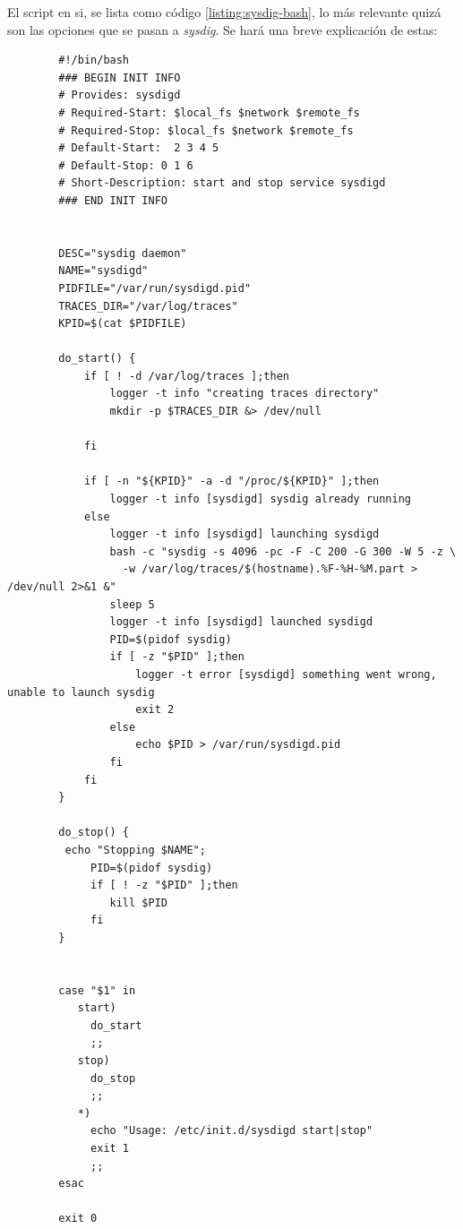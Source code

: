 El script en si, se lista como código \ref{listing:sysdig-bash}, lo más relevante quizá
son las opciones que se pasan a \emph{sysdig}. Se hará una breve explicación de estas:
 \begin{verbatim}
        #!/bin/bash
        ### BEGIN INIT INFO
        # Provides: sysdigd
        # Required-Start: $local_fs $network $remote_fs
        # Required-Stop: $local_fs $network $remote_fs
        # Default-Start:  2 3 4 5
        # Default-Stop: 0 1 6
        # Short-Description: start and stop service sysdigd
        ### END INIT INFO
        
        
        DESC="sysdig daemon"
        NAME="sysdigd"
        PIDFILE="/var/run/sysdigd.pid"
        TRACES_DIR="/var/log/traces"
        KPID=$(cat $PIDFILE)
        
        do_start() {
            if [ ! -d /var/log/traces ];then
                logger -t info "creating traces directory"
                mkdir -p $TRACES_DIR &> /dev/null
        
            fi
        
            if [ -n "${KPID}" -a -d "/proc/${KPID}" ];then
                logger -t info [sysdigd] sysdig already running
            else
                logger -t info [sysdigd] launching sysdigd
                bash -c "sysdig -s 4096 -pc -F -C 200 -G 300 -W 5 -z \
                  -w /var/log/traces/$(hostname).%F-%H-%M.part > /dev/null 2>&1 &"
                sleep 5
                logger -t info [sysdigd] launched sysdigd
                PID=$(pidof sysdig)
                if [ -z "$PID" ];then
                    logger -t error [sysdigd] something went wrong, unable to launch sysdig
                    exit 2
                else
                    echo $PID > /var/run/sysdigd.pid
                fi
            fi
        }
        
        do_stop() {
         echo "Stopping $NAME";
             PID=$(pidof sysdig)
             if [ ! -z "$PID" ];then
                kill $PID
             fi
        }
        
        
        case "$1" in
           start)
             do_start
             ;;
           stop)
             do_stop
             ;;
           *)
             echo "Usage: /etc/init.d/sysdigd start|stop"
             exit 1
             ;;
        esac
        
        exit 0
    \end{verbatim}

